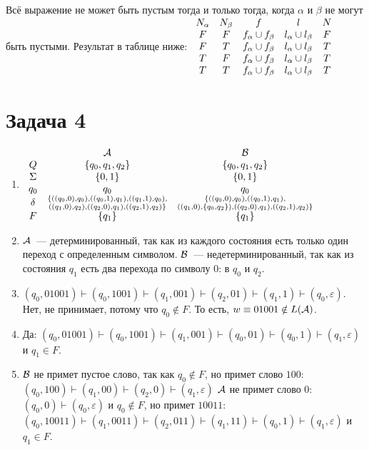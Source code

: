 \documentclass[a4paper]{article}
\begin{document}
\begin{enumerate}
Всё выражение не может быть пустым тогда и только тогда, когда $\alpha$ и $\beta$ не могут быть пустыми. Результат в таблице ниже:
$
\newline
\begin{array}{ccccc}
N_\alpha & N_\beta & f & l & N\\
F & F & f_\alpha \cup f_\beta & l_\alpha \cup l_\beta & F \\
F & T & f_\alpha \cup f_\beta & l_\alpha \cup l_\beta & T\\
T & F & f_\alpha \cup f_\beta & l_\alpha \cup l_\beta & T\\
T & T & f_\alpha \cup f_\beta & l_\alpha \cup l_\beta & T\\
\end{array}
$
\end{enumerate}
\section*{Задача 4}
\begin{enumerate}[1.]
\item $\begin{array}{ccc}
& {\cal A} & {\cal B} \\
Q & \{q_0,q_1,q_2\} & \{q_0,q_1,q_2\}\\
\Sigma & \{0,1\} & \{0,1\}\\
q_0 & q_0 & q_0\\
\delta & \substack{\{((q_0,0),q_0),((q_0,1),q_1),((q_1,1),q_0),\\((q_1,0),q_2),((q_2,0),q_1),((q_2,1),q_2)\}} & \substack{\{((q_0,0),q_0),((q_0,1),q_1),\\((q_1,0),\{q_0,q_2\}),((q_2,0),q_1),((q_2,1),q_2)\}}\\
F & \{q_1\} & \{q_1\}\\
\end{array}$
\item ${\cal A}$~--- детерминированный, так как из каждого состояния есть только один переход с определенным символом.\newline
${\cal B}$~--- недетерминированный, так как из состояния $q_1$ есть два перехода по символу $0$: в $q_0$ и $q_2$.
\item $(q_0,01001)\vdash(q_0,1001)\vdash(q_1,001)\vdash(q_2,01)\vdash(q_1,1)\vdash(q_0,\varepsilon)$. Нет, не принимает, потому что $q_0\notin F$. То есть, $w\equiv 01001\notin L({\cal A})$.
\item Да: $(q_0,01001)\vdash(q_0,1001)\vdash(q_1,001)\vdash(q_0,01)\vdash(q_0,1)\vdash(q_1,\varepsilon)$ и $q_1\in F$.
\item ${\cal B}$ не примет пустое слово, так как $q_0\notin F$, но примет слово $100$: $(q_0,100)\vdash(q_1,00)\vdash(q_2,0)\vdash(q_1,\varepsilon)$\newline
${\cal A}$ не примет слово $0$: $(q_0,0)\vdash(q_0,\varepsilon)$ и $q_0\notin F$, но примет $10011$: $(q_0,10011)\vdash(q_1,0011)\vdash(q_2,011)\vdash(q_1,11)\vdash(q_0,1)\vdash(q_1,\varepsilon)$ и $q_1\in F$.
\end{enumerate}
\newpage
\end{document}
